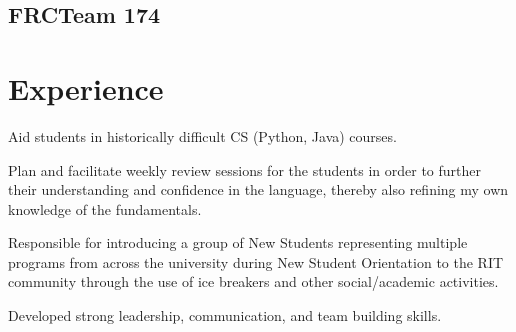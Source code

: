 \documentclass[]{deedy-resume-openfont}
\begin{document}
\begin{minipage}[t]{0.30\textwidth}
\vspace{\topsep} %

\subsection{FRC\textregistered Team 174}

\sectionsep

%
%

\end{minipage}
\hfill
\begin{minipage}[t]{0.67\textwidth}


\section{Experience}
\vspace{\topsep} %
\begin{tightemize}\item Aid students in historically difficult CS (Python, Java) courses.
  \item Plan and facilitate weekly review sessions for the students in order to further their understanding and confidence in the language, thereby also refining my own knowledge of the fundamentals.
\end{tightemize}
\sectionsep

\begin{tightemize}
\item Responsible for introducing a group of New Students representing multiple programs from across the
university during New Student Orientation to the RIT community through the use of ice breakers and other social/academic activities.
\item Developed strong leadership, communication, and team building skills.
\end{tightemize}
\sectionsep


\end{minipage}
\end{document}

